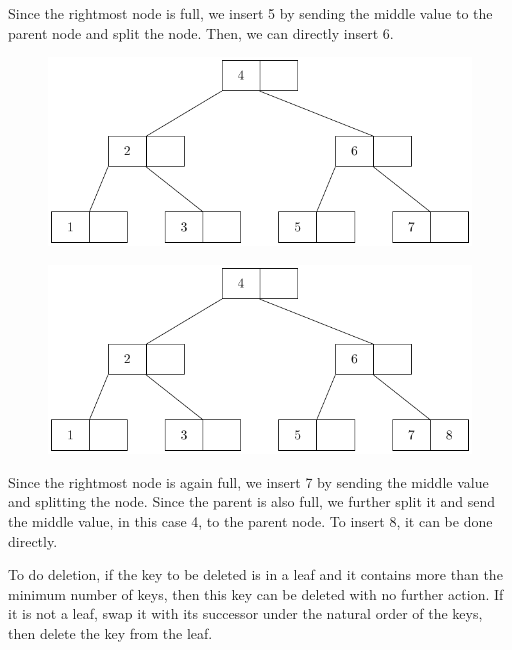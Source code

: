 Since the rightmost node is full, we insert 5 by sending the middle value to the parent node and split the node. Then, we can directly insert 6.

\begin{center}
\begin{minipage}{0.45\textwidth}
\begin{figure}[H]
  \centering
  \includegraphics[width=\textwidth]{Figure/BT_D7.pdf}
\end{figure}
\end{minipage}
\begin{minipage}{0.45\textwidth}
\begin{figure}[H]
  \centering
  \includegraphics[width=\textwidth]{Figure/BT_D8.pdf}
\end{figure}
\end{minipage}  
\end{center}

Since the rightmost node is again full, we insert 7 by sending the middle value and splitting the node. Since the parent is also full, we further split it and send the middle value, in this case 4, to the parent node. To insert 8, it can be done directly.

To do deletion, if the key to be deleted is in a leaf and it contains more than the minimum number of keys, then this key can be deleted with no further action. If it is not a leaf, swap it with its successor under the natural order of the keys, then delete the key from the leaf. 

